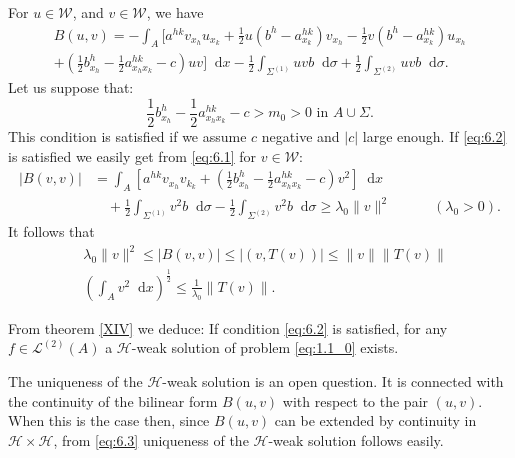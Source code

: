 \documentclass[a4paper,12pt,leqno]{article}
\numberwithin{equation}{section}
\newenvironment{thm}[1]
{\renewcommand\theinnerproblem{#1}\innerproblem}
{\endinnerproblem}
\newcommand{\dd}{\mathop{}\!\mathrm{d}}
\begin{document}
For $u \in \mathscr{W}$, and $v \in \mathscr{W}$, we have
\begin{equation} \label{eq:6.1}
	\begin{split}
		B(u, v)=-\int_{A} \Big[a^{h k} v_{x_{h}} u_{x_{k}}+
		\frac{1}{2} u\left(b^{h}-a_{x_{k}}^{h k}\right) v_{x_{h}}
		-\frac{1}{2} v\left(b^{h}-a_{x_{k}}^{h k}\right) u_{x_{h}} \\
		+\left(\frac{1}{2} b_{x_{h}}^{h}-\frac{1}{2} a_{x_{h} x_{k}}^{h k}-c\right) u v\Big] \dd x
		-\frac{1}{2} \int_{\Sigma^{(1)}} u v b \dd \sigma
		+\frac{1}{2} \int_{\Sigma^{(2)}} u v b \dd \sigma .
	\end{split}
\end{equation}
Let us suppose that:
\begin{equation} \label{eq:6.2}
	 \frac{1}{2} b_{x_{h}}^{h}-\frac{1}{2} a_{x_{h} x_{k}}^{h k}-c>m_{0}>0 \text{ in } A \cup \Sigma.
\end{equation}
This condition is satisfied if we assume $c$ negative and $|c|$ large enough. If \eqref{eq:6.2} is satisfied we easily get from \eqref{eq:6.1} for $v \in \mathscr{W}$:
\begin{equation*}
	\begin{split}
		|B(v, v)|&=\int_{A}\left[a^{h k} v_{x_{h}} v_{k_{k}}+\left(\frac{1}{2} b_{x_{h}}^{h}-\frac{1}{2} a_{x_{h} x_{k}}^{h k}-c\right) v^{2}\right] \dd x \\
		& \quad 
		+\frac{1}{2} \int_{\Sigma^{(1)}} v^2 b \dd \sigma
		-\frac{1}{2} \int_{\Sigma^{(2)}} v^2 b \dd \sigma
		\geq \lambda_0 \|v\|^2
		\quad\quad\quad (\lambda_0 > 0).
	\end{split}
\end{equation*}
It follows that
\begin{equation} \label{eq:6.3}
	\begin{split}
		& \lambda_0 \|v\|^{2} \leq |B(v, v)| \leq |(v, T(v))|\leq\|v\|\|T(v)\| \\
		& \left(\int_{A} v^{2} \dd x\right)^{\frac{1}{2}} \leq \frac{1}{\lambda_{0}}\|T(v)\| .
	\end{split}
\end{equation}

From theorem \cref{XIV} we deduce:
\begin{thm}{XX}
	If condition \eqref{eq:6.2} is satisfied, for any $f \in \mathscr{L}^{(2)}(A)$ a $\mathscr{H}$-weak solution of problem \eqref{eq:1.1_0} exists.
\end{thm}

The uniqueness of the $\mathscr{H}$-weak solution is an open question. It is connected with the continuity of the bilinear form $B(u, v)$ with respect to the pair $(u, v)$. When this is the case then, since $B(u, v)$ can be extended by continuity in $\mathscr{H} \times \mathscr{H}$, from \eqref{eq:6.3} uniqueness of the $\mathscr{H}$-weak solution follows easily.
\end{document}
